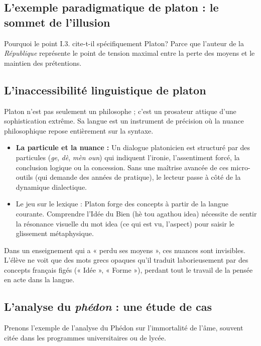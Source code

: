 \subsection{L'exemple paradigmatique de platon : le sommet de l'illusion}

Pourquoi le point I.3.\cite{I-3-3-ref3} cite-t-il spécifiquement Platon? Parce que l'auteur de la
\textit{République} représente le point de tension maximal entre la perte des moyens et le maintien
des prétentions.



\subsection{L'inaccessibilité linguistique de platon}

Platon n'est pas seulement un philosophe ; c'est un prosateur attique d'une sophistication extrême.
Sa langue est un instrument de précision où la nuance philosophique repose entièrement sur la
syntaxe.

\begin{itemize}\item \textbf{La particule et la nuance :} Un dialogue platonicien est structuré par des particules (\textit{ge}, \textit{dè}, \textit{mèn oun}) qui indiquent l'ironie, l'assentiment forcé, la conclusion logique ou la concession. Sans une maîtrise avancée de ces micro-outils (qui demande des années de pratique), le lecteur passe à côté de la dynamique dialectique.\item Le jeu sur le lexique : Platon forge des concepts à partir de la langue courante. Comprendre l'Idée du Bien (hè tou agathou idea) nécessite de sentir la résonance visuelle du mot idea (ce qui est vu, l'aspect) pour saisir le glissement métaphysique.\end{itemize}Dans un enseignement qui a « perdu ses moyens », ces nuances sont invisibles. L'élève ne voit que
des mots grecs opaques qu'il traduit laborieusement par des concepts français figés (« Idée », «
Forme »), perdant tout le travail de la pensée en acte dans la langue.



\subsection{L'analyse du \textit{phédon} : une étude de cas}

Prenons l'exemple de l'analyse du Phédon sur l'immortalité de l'âme, souvent citée dans les
programmes universitaires ou de lycée.\cite{I-3-3-ref12}

